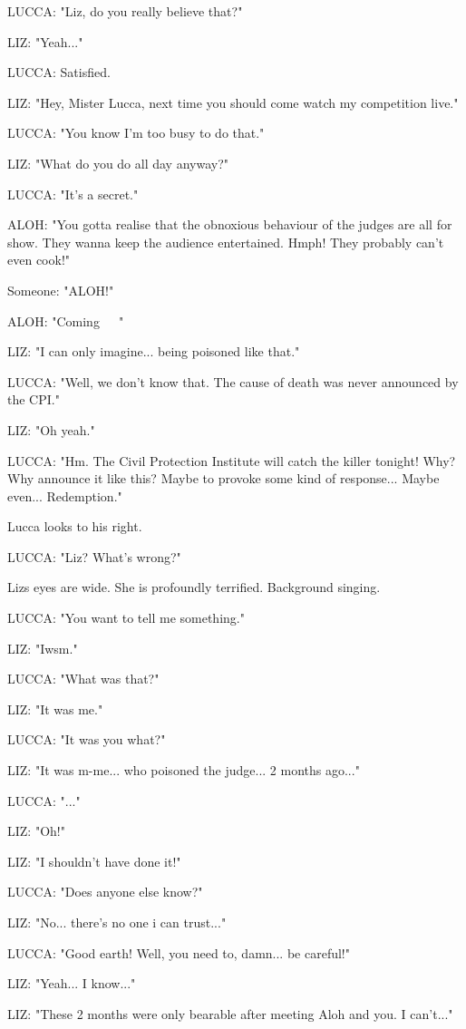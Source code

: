 \documentclass[11pt]{article}
\begin{document}
LUCCA: "Liz, do you really believe that?"

LIZ: "Yeah..."

LUCCA: Satisfied.

LIZ: "Hey, Mister Lucca, next time you should come watch my competition live."

LUCCA: "You know I'm too busy to do that."

LIZ: "What do you do all day anyway?"

LUCCA: "It's a secret."

ALOH: "You gotta realise that the obnoxious behaviour of the judges are all for show. 
They wanna keep the audience entertained.
Hmph! They probably can't even cook!"

Someone: "ALOH!"

ALOH: "Coming~~~"

LIZ: "I can only imagine... being poisoned like that."

LUCCA: "Well, we don't know that. 
The cause of death was never announced by the CPI."

LIZ: "Oh yeah."

LUCCA: "Hm.
The Civil Protection Institute will catch the killer tonight!
Why? Why announce it like this?
Maybe to provoke some kind of response...
Maybe even...
Redemption."

Lucca looks to his right.

LUCCA: "Liz? What's wrong?"

Lizs eyes are wide. She is profoundly terrified.
Background singing.

LUCCA: "You want to tell me something."

LIZ: "Iwsm."

LUCCA: "What was that?"

LIZ: "It was me."

LUCCA: "It was you what?"

LIZ: "It was m-me... who poisoned the judge... 2 months ago..."

LUCCA: "..."

LIZ: "Oh!"

LIZ: "I shouldn't have done it!"

LUCCA: "Does anyone else know?"

LIZ: "No... there's no one i can trust..."

LUCCA: "Good earth! Well, you need to, damn... be careful!"

LIZ: "Yeah... I know..."

LIZ: "These 2 months were only bearable after meeting Aloh and you. 
I can't..."
\end{document}
